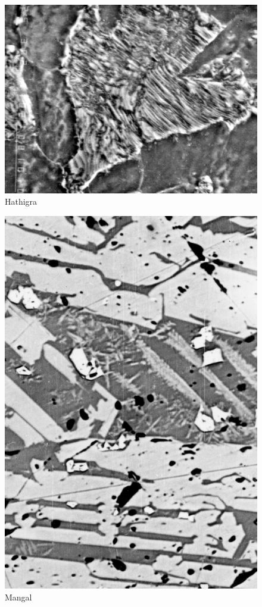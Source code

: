 \begin{figure}[H]
\renewcommand{\thefigure}{18C}
\includegraphics[scale=0.65]{images/chapter-4/fig018C.jpg}
\caption{Hathigra}\label{chapter-4-fig18C}
\end{figure}

\begin{figure}[H]
\renewcommand{\thefigure}{19A}
\includegraphics[scale=0.63]{images/chapter-4/fig019A.jpg}
\caption{Mangal}\label{chapter-4-fig19A}
\end{figure}

